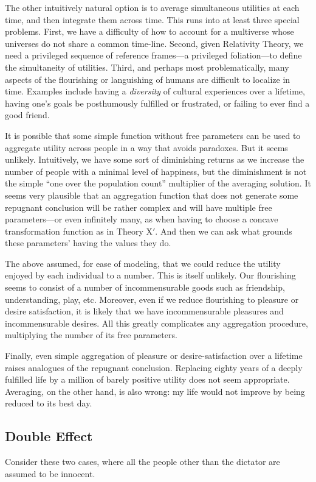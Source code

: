The other intuitively natural option is to average simultaneous utilities at each time, and then integrate them across time. This runs into
at least three special problems. First, we have a difficulty of how to account for a multiverse whose universes do not share a 
common time-line. Second, given Relativity Theory, we need a privileged sequence of reference frames---a privileged foliation---to define the 
simultaneity of utilities. Third, and perhaps most problematically, many aspects of the flourishing or languishing of 
humans are difficult to localize in time. Examples include having a \textit{diversity} of cultural experiences over a lifetime, having 
one's goals be posthumously fulfilled or frustrated, or failing to ever find a good friend.


It is possible that some simple function without free parameters can be used to aggregate utility across people in a way that
avoids paradoxes. But it seems unlikely. Intuitively, we have some sort of diminishing returns as we increase the number of
people with a minimal level of happiness, but the diminishment is not the simple ``one over the population count'' multiplier of
the averaging solution. It seems very plausible that an aggregation function that does not generate some repugnant conclusion will
be rather complex and will have multiple free parameters---or even infinitely many, as when having to choose a 
concave transformation function as in  Theory X$'$. And then we can ask what grounds these parameters' having the values they do. 


The above assumed, for ease of modeling, that we could reduce the utility enjoyed by each individual to a number. This is itself unlikely. Our flourishing seems to consist of a number of incommensurable goods such 
as friendship, understanding, play, etc. Moreover, even if we reduce flourishing to pleasure or desire satisfaction, it is 
likely that we have incommensurable pleasures and incommensurable desires. All this greatly complicates any aggregation procedure,
multiplying the number of its free parameters. 

Finally, even simple aggregation of pleasure or desire-satisfaction over a lifetime raises analogues of the 
repugnant conclusion. Replacing eighty years of a deeply fulfilled life by a million of barely positive
utility does not seem appropriate. Averaging, on the other hand, is also wrong: my life would not improve by
being reduced to its best day. 

\subsection{Double Effect}
Consider these two cases, where all the people other than the dictator are assumed to be innocent.

